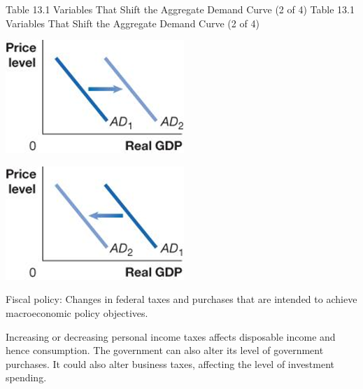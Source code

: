\documentclass[
  12pt,
  ignorenonframetext,
]{beamer}
\begin{document}
\begin{frame}{Table 13.1 Variables That Shift the Aggregate Demand Curve
(2 of 4)}
\protect\hypertarget{table-13.1-variables-that-shift-the-aggregate-demand-curve-2-of-4}{}
Table 13.1 Variables That Shift the Aggregate Demand Curve (2 of 4)

\includegraphics[width=\textwidth,height=0.99\textheight]{imgs3/img_slide14a.png}

\includegraphics[width=\textwidth,height=0.99\textheight]{imgs3/img_slide14b.png}

Fiscal policy: Changes in federal taxes and purchases that are intended
to achieve macroeconomic policy objectives.

Increasing or decreasing personal income taxes affects disposable income
and hence consumption. The government can also alter its level of
government purchases. It could also alter business taxes, affecting the
level of investment spending.
\end{frame}
\end{document}
